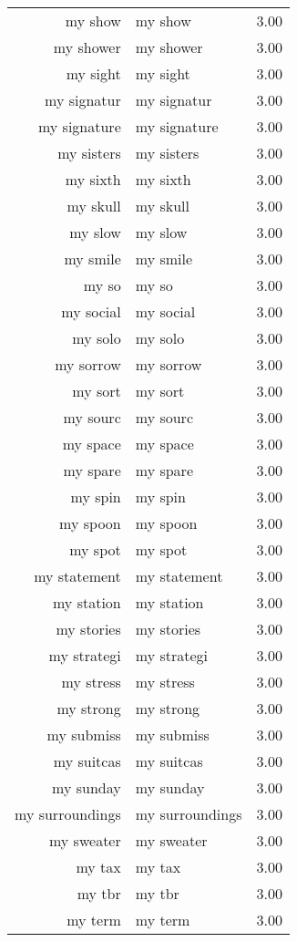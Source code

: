 \begin{table}[ht]
\begin{tabular}{rlr}
  my show & my show & 3.00 \\ 
  my shower & my shower & 3.00 \\ 
  my sight & my sight & 3.00 \\ 
  my signatur & my signatur & 3.00 \\ 
  my signature & my signature & 3.00 \\ 
  my sisters & my sisters & 3.00 \\ 
  my sixth & my sixth & 3.00 \\ 
  my skull & my skull & 3.00 \\ 
  my slow & my slow & 3.00 \\ 
  my smile & my smile & 3.00 \\ 
  my so & my so & 3.00 \\ 
  my social & my social & 3.00 \\ 
  my solo & my solo & 3.00 \\ 
  my sorrow & my sorrow & 3.00 \\ 
  my sort & my sort & 3.00 \\ 
  my sourc & my sourc & 3.00 \\ 
  my space & my space & 3.00 \\ 
  my spare & my spare & 3.00 \\ 
  my spin & my spin & 3.00 \\ 
  my spoon & my spoon & 3.00 \\ 
  my spot & my spot & 3.00 \\ 
  my statement & my statement & 3.00 \\ 
  my station & my station & 3.00 \\ 
  my stories & my stories & 3.00 \\ 
  my strategi & my strategi & 3.00 \\ 
  my stress & my stress & 3.00 \\ 
  my strong & my strong & 3.00 \\ 
  my submiss & my submiss & 3.00 \\ 
  my suitcas & my suitcas & 3.00 \\ 
  my sunday & my sunday & 3.00 \\ 
  my surroundings & my surroundings & 3.00 \\ 
  my sweater & my sweater & 3.00 \\ 
  my tax & my tax & 3.00 \\ 
  my tbr & my tbr & 3.00 \\ 
  my term & my term & 3.00 \\ 

\end{tabular}
\end{table}

